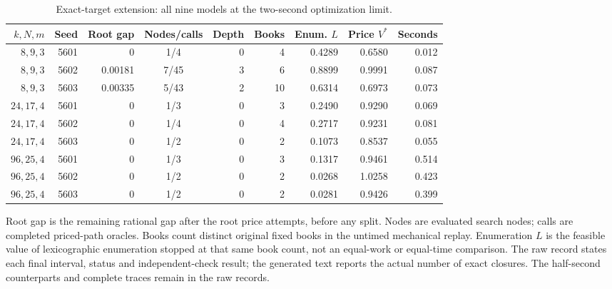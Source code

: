 \begin{table}[p]\centering\small
\caption{Exact-target extension: all nine models at the two-second optimization limit.}\label{tab:exact56}
\begin{tabular}{@{}rrrcrrrrr@{}}\toprule
$k,N,m$ & Seed & Root gap & Nodes/calls & Depth & Books & Enum. $L$ & Price $V^*$ & Seconds \\ \midrule
$8,9,3$ & 5601 & 0 & 1/4 & 0 & 4 & 0.4289 & 0.6580 & 0.012 \\
$8,9,3$ & 5602 & 0.00181 & 7/45 & 3 & 6 & 0.8899 & 0.9991 & 0.087 \\
$8,9,3$ & 5603 & 0.00335 & 5/43 & 2 & 10 & 0.6314 & 0.6973 & 0.073 \\
$24,17,4$ & 5601 & 0 & 1/3 & 0 & 3 & 0.2490 & 0.9290 & 0.069 \\
$24,17,4$ & 5602 & 0 & 1/4 & 0 & 4 & 0.2717 & 0.9231 & 0.081 \\
$24,17,4$ & 5603 & 0 & 1/2 & 0 & 2 & 0.1073 & 0.8537 & 0.055 \\
$96,25,4$ & 5601 & 0 & 1/3 & 0 & 3 & 0.1317 & 0.9461 & 0.514 \\
$96,25,4$ & 5602 & 0 & 1/2 & 0 & 2 & 0.0268 & 1.0258 & 0.423 \\
$96,25,4$ & 5603 & 0 & 1/2 & 0 & 2 & 0.0281 & 0.9426 & 0.399 \\
\bottomrule\end{tabular}
\par\smallskip\begin{minipage}{\textwidth}\footnotesize Root gap is the remaining rational gap after the root price attempts, before any split. Nodes are evaluated search nodes; calls are completed priced-path oracles. Books count distinct original fixed books in the untimed mechanical replay. Enumeration $L$ is the feasible value of lexicographic enumeration stopped at that same book count, not an equal-work or equal-time comparison. The raw record states each final interval, status and independent-check result; the generated text reports the actual number of exact closures. The half-second counterparts and complete traces remain in the raw records.\end{minipage}
\end{table}\clearpage
